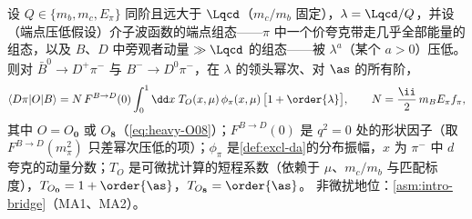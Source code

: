\begin{theorem}\label{thm:heavy-bdpi}
设 $Q\in\{m_b,m_c,E_\pi\}$ 同阶且远大于 $\Lqcd$（$m_c/m_b$ 固定），$\lambda=\Lqcd/Q$，并设（端点压低假设）介子波函数的端点组态——$\pi$ 中一个价夸克带走几乎全部能量的组态，以及 $B$、$D$ 中旁观者动量 $\gg\Lqcd$ 的组态——被 $\lambda^{a}$（某个 $a>0$）压低。则对 $\bar B^0\to D^+\pi^-$ 与 $B^-\to D^0\pi^-$，在 $\lambda$ 的领头幂次、对 $\as$ 的所有阶，
\begin{equation}\label{eq:heavy-bdpi}
\langle D\pi|O|B\rangle=N\,F^{B\to D}(0)\int_0^1\dd x\;T_O(x,\mu)\,\phi_\pi(x,\mu)\,\big[1+\order{\lambda}\big],\qquad N=\frac{\ii}{2}\,m_BE_\pi f_\pi ,
\end{equation}
其中 $O=O_{\mathbf 0}$ 或 $O_{\mathbf 8}$（\cref{eq:heavy-O08}）；$F^{B\to D}(0)$ 是 $q^2=0$ 处的形状因子（取 $F^{B\to D}(m_\pi^2)$ 只差幂次压低的项）；$\phi_\pi$ 是\cref{def:excl-da}的分布振幅，$x$ 为 $\pi^-$ 中 $d$ 夸克的动量分数；$T_O$ 是可微扰计算的短程系数（依赖于 $\mu$、$m_c/m_b$ 与匹配标度），$T_{O_{\mathbf 0}}=1+\order{\as}$，$T_{O_{\mathbf 8}}=\order{\as}$。
非微扰地位：\cref{asm:intro-bridge}（MA1、MA2）。
\end{theorem}

